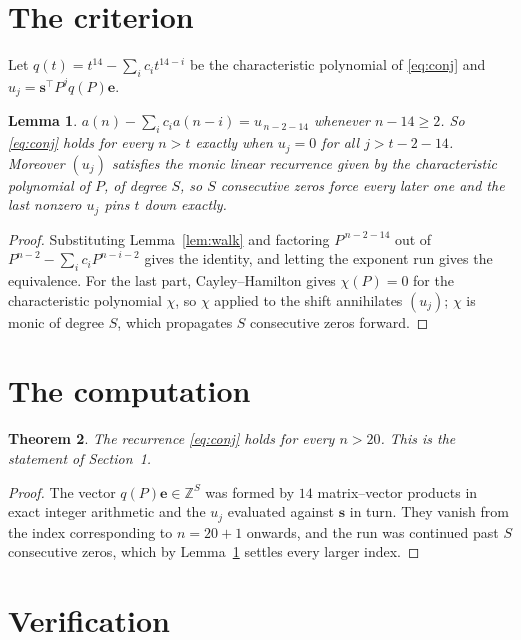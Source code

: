 \documentclass[11pt,a4paper]{article}
\theoremstyle{plain}
\newtheorem{theorem}{Theorem}
\newtheorem{lemma}[theorem]{Lemma}
\theoremstyle{definition}
\begin{document}
\section{The criterion}

Let $q(t)=t^{14}-\sum_i c_i t^{14-i}$ be the characteristic polynomial of
\eqref{eq:conj} and $u_j=\mathbf{s}^{\!\top}P^{j}q(P)\mathbf{e}$.

\begin{lemma}\label{lem:crit}
$a(n)-\sum_i c_i a(n-i)=u_{\,n-2-14}$ whenever $n-14\ge2$. So \eqref{eq:conj}
holds for every $n>t$ exactly when $u_j=0$ for all $j>t-2-14$. Moreover $(u_j)$
satisfies the monic linear recurrence given by the characteristic polynomial of $P$, of
degree $S$, so $S$ consecutive zeros force every later one and the last nonzero $u_j$ pins
$t$ down exactly.
\end{lemma}

\begin{proof}
Substituting Lemma~\ref{lem:walk} and factoring $P^{\,n-2-14}$ out of
$P^{n-2}-\sum_i c_i P^{n-i-2}$ gives the identity, and letting the exponent run gives the
equivalence. For the last part, Cayley--Hamilton gives $\chi(P)=0$ for the characteristic
polynomial $\chi$, so $\chi$ applied to the shift annihilates $(u_j)$; $\chi$ is monic of
degree $S$, which propagates $S$ consecutive zeros forward.
\end{proof}

\section{The computation}

\begin{theorem}
The recurrence \eqref{eq:conj} holds for every $n>20$. This is the statement of
Section~1.
\end{theorem}

\begin{proof}
The vector $q(P)\mathbf{e}\in\mathbb{Z}^{S}$ was formed by $14$ matrix--vector
products in exact integer arithmetic and the $u_j$ evaluated against $\mathbf{s}$ in turn.
They vanish from the index corresponding to $n=20+1$ onwards, and the run was continued
past $S$ consecutive zeros, which by Lemma~\ref{lem:crit} settles every larger index.
\end{proof}

\section{Verification}
\end{document}
